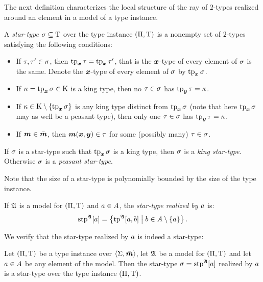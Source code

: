 The next definition characterizes the local structure of the ray of $2$-types
realized around an element in a model of a type instance.
\begin{definition}
A \emph{star-type} $\sigma \subseteq \mathrm{T}$ over the type instance
$(\Pi,\mathrm{T})$ is a nonempty set of $2$-types satisfying the following conditions:
\begin{itemize}
  \item[\stpcond1]\label{cond:stp-1} If $\tau, {\tau'} \in \sigma$, then
  $\operatorname{tp}_{\bm{x}}\tau = \operatorname{tp}_{\bm{x}}{\tau'}$, that is the $\bm{x}$-type of every element of $\sigma$ is the same.
  Denote the $\bm{x}$-type of every element of $\sigma$ by $\operatorname{tp}_{\bm{x}}\sigma$.
  \item[\stpcond2]\label{cond:stp-2} If $\kappa = \operatorname{tp}_{\bm{x}}\sigma \in \mathrm{K}$ is a
  king type, then no $\tau\in\sigma$ has $\operatorname{tp}_{\bm{y}}\tau = \kappa$.
  \item[\stpcond3]\label{cond:stp-3} If $\kappa \in \mathrm{K} \setminus \left\{\operatorname{tp}_{\bm{x}}\sigma\right\}$
  is any king type distinct from $\operatorname{tp}_{\bm{x}}\sigma$ (note that here $\operatorname{tp}_{\bm{x}}\sigma$ may as well be a
  peasant type), then only one $\tau\in\sigma$ has $\operatorname{tp}_{\bm{y}}\tau = \kappa$.
  \item[\stpcond4]\label{cond:stp-4} If $\bm{m} \in \bar{\bm{m}}$, then $\bm{m}(\bm{x},\bm{y})
  \in \tau$ for some (possibly many) $\tau \in \sigma$.
\end{itemize}
If $\sigma$ is a star-type such that $\operatorname{tp}_{\bm{x}}\sigma$ is a king type, then $\sigma$ is
a \emph{king star-type}. Otherwise $\sigma$ is a \emph{peasant star-type}.

Note that the size of a star-type is polynomially bounded by the size of the
type instance.

If $\mathfrak{A}$ is a model for $(\Pi,\mathrm{T})$ and $a \in A$, the
\emph{star-type realized by $a$} is:
\[
  \operatorname{stp}^{\mathfrak{A}}[a] = \left\{\operatorname{tp}^{\mathfrak{A}}[a,b]\mathrel{}\middle|\mathrel{}b \in A \setminus \left\{a\right\}\right\}.
\]
\end{definition}
We verify that the star-type realized by $a$ is indeed a star-type:
\begin{remark}
Let $(\Pi,\mathrm{T})$ be a type instance over $\left\langle \mathrm{\Sigma},\bar{\bm{m}} \right\rangle$, let $\mathfrak{A}$ be
a model for $(\Pi,\mathrm{T})$ and let $a \in A$ be any element of the
model.
Then the star-type $\sigma = \operatorname{stp}^{\mathfrak{A}}[a]$ realized by $a$ is a star-type
over the type instance
$(\Pi,\mathrm{T})$.
\end{remark}
